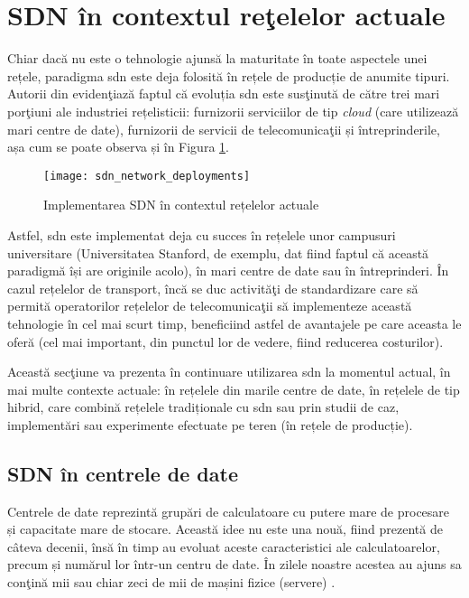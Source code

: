 \section{SDN în contextul reţelelor actuale}

Chiar dacă nu este o tehnologie ajunsă la maturitate în toate aspectele unei rețele, paradigma \gls{sdn} este deja folosită în rețele de producție de anumite tipuri. Autorii din \cite{alvizu2017comprehensive} evidenţiază faptul că evoluția \gls{sdn} este susţinută de către trei mari porţiuni ale industriei rețelisticii: furnizorii serviciilor de tip \textit{cloud} (care utilizează mari centre de date), furnizorii de servicii de telecomunicaţii și întreprinderile, așa cum se poate observa și în Figura \ref{fig:sdn_network_deployments}. 

\begin{figure}[h]
	\centering
	\texttt{[image: sdn\_network\_deployments]}
	\caption{Implementarea SDN în contextul rețelelor actuale~\cite{alvizu2017comprehensive}}
	\label{fig:sdn_network_deployments}
\end{figure}

Astfel, \gls{sdn} este implementat deja cu succes în rețelele unor campusuri universitare (Universitatea Stanford, de exemplu, dat fiind faptul că această paradigmă își are originile acolo), în mari centre de date sau în întreprinderi. În cazul rețelelor de transport, încă se duc activităţi de standardizare care să permită operatorilor rețelelor de telecomunicaţii să implementeze această tehnologie în cel mai scurt timp, beneficiind astfel de avantajele pe care aceasta le oferă (cel mai important, din punctul lor de vedere, fiind reducerea costurilor).

Această secţiune va prezenta în continuare utilizarea \gls{sdn} la momentul actual, în mai multe contexte actuale: în rețelele din marile centre de date, în rețelele de tip hibrid, care combină rețelele tradiționale cu \gls{sdn} sau prin studii de caz, implementări sau experimente efectuate pe teren (în rețele de producție).

\subsection{SDN în centrele de date}

Centrele de date reprezintă grupări de calculatoare cu putere mare de procesare și capacitate mare de stocare. Această idee nu este una nouă, fiind prezentă de câteva decenii, însă în timp au evoluat aceste caracteristici ale calculatoarelor, precum și numărul lor într-un centru de date. În zilele noastre acestea au ajuns sa conţină mii sau chiar zeci de mii de mașini fizice (servere) \cite{goransson2016software}.

